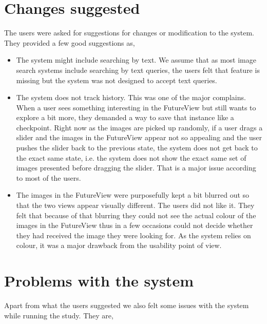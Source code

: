 \documentclass[english]{tktltiki}
\begin{document}
\section{Changes suggested}

The users were asked for suggestions for changes or modification to the system. They provided a few good suggestions as,

\begin{itemize}
	\item The system might include searching by text. We assume that as most image search systems include searching by text queries, the users felt that feature is missing but the system was not designed to accept text queries.
	\item The system does not track history. This was one of the major complains. When a user sees something interesting in the FutureView but still wants to explore a bit more, they demanded a way to save that instance like a checkpoint. Right now as the images are picked up randomly, if a user drags a slider and the images in the FutureView appear not so appealing and the user pushes the slider back to the previous state, the system does not get back to the exact same state, i.e. the system does not show the exact same set of images presented before dragging the slider. That is a major issue according to most of the users.
	\item The images in the FutureView were purposefully kept a bit blurred out so that the two views appear visually different. The users did not like it. They felt that because of that blurring they could not see the actual colour of the images in the FutureView thus in a few occasions could not decide whether they had received the image they were looking for. As the system relies on colour, it was a major drawback from the usability point of view.
\end{itemize}

\section{Problems with the system}

Apart from what the users suggested we also felt some issues with the system while running the study. They are,
\end{document}

